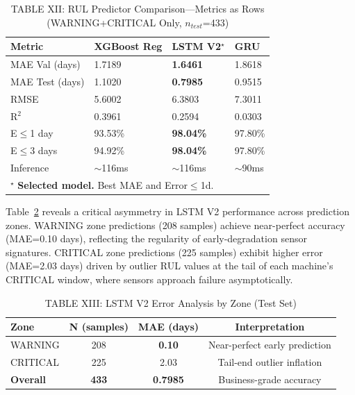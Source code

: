 \documentclass[conference]{IEEEtran}
\begin{document}
\begin{table}[htbp]
\caption{TABLE XII: RUL Predictor Comparison---Metrics as Rows
         (WARNING+CRITICAL Only, $n_{test}$=433)}
\centering
\begin{tabular}{lp{1.5cm}p{1.5cm}p{1.5cm}}
\hline
\textbf{Metric} & \textbf{XGBoost Reg} & \textbf{LSTM V2}$^{\star}$ & \textbf{GRU} \\
\hline
MAE Val (days)   & 1.7189 & \textbf{1.6461} & 1.8618 \\
MAE Test (days)  & 1.1020 & \textbf{0.7985} & 0.9515 \\
RMSE             & 5.6002 & 6.3803          & 7.3011 \\
R$^{2}$          & 0.3961 & 0.2594          & 0.0303 \\
E$\leq$1 day     & 93.53\% & \textbf{98.04\%} & 97.80\% \\
E$\leq$3 days    & 94.92\% & \textbf{98.04\%} & 97.80\% \\
Inference        & $\sim$116ms & $\sim$116ms & $\sim$90ms \\
\hline
\multicolumn{4}{l}{$^{\star}$ \textbf{Selected model.} Best MAE and Error$\leq$1d.}\\
\hline
\end{tabular}
\label{tab:rul_results}
\end{table}

Table~\ref{tab:lstm_zone} reveals a critical asymmetry in LSTM V2 performance across prediction zones. WARNING zone predictions (208 samples) achieve near-perfect accuracy (MAE=0.10 days), reflecting the regularity of early-degradation sensor signatures. CRITICAL zone predictions (225 samples) exhibit higher error (MAE=2.03 days) driven by outlier RUL values at the tail of each machine's CRITICAL window, where sensors approach failure asymptotically.

\begin{table}[htbp]
\caption{TABLE XIII: LSTM V2 Error Analysis by Zone (Test Set)}
\centering
\begin{tabular}{lccc}
\hline
\textbf{Zone} & \textbf{N (samples)} & \textbf{MAE (days)} & \textbf{Interpretation} \\
\hline
WARNING & 208 & \textbf{0.10} & Near-perfect early prediction \\
CRITICAL & 225 & 2.03 & Tail-end outlier inflation \\
\hline
\textbf{Overall} & \textbf{433} & \textbf{0.7985} & Business-grade accuracy \\
\hline
\end{tabular}
\label{tab:lstm_zone}
\end{table}
\end{document}
